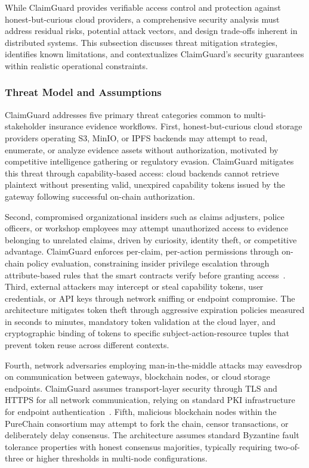 \documentclass[final,5p,times,twocolumn]{elsarticle}
\begin{document}
While ClaimGuard provides verifiable access control and protection against honest-but-curious cloud providers, a comprehensive security analysis must address residual risks, potential attack vectors, and design trade-offs inherent in distributed systems. This subsection discusses threat mitigation strategies, identifies known limitations, and contextualizes ClaimGuard's security guarantees within realistic operational constraints.

\subsubsection{Threat Model and Assumptions}

ClaimGuard addresses five primary threat categories common to multi-stakeholder insurance evidence workflows. First, honest-but-curious cloud storage providers operating S3, MinIO, or IPFS backends may attempt to read, enumerate, or analyze evidence assets without authorization, motivated by competitive intelligence gathering or regulatory evasion. ClaimGuard mitigates this threat through capability-based access: cloud backends cannot retrieve plaintext without presenting valid, unexpired capability tokens issued by the gateway following successful on-chain authorization.

Second, compromised organizational insiders such as claims adjusters, police officers, or workshop employees may attempt unauthorized access to evidence belonging to unrelated claims, driven by curiosity, identity theft, or competitive advantage. ClaimGuard enforces per-claim, per-action permissions through on-chain policy evaluation, constraining insider privilege escalation through attribute-based rules that the smart contracts verify before granting access~\cite{xiong2023bdim}. Third, external attackers may intercept or steal capability tokens, user credentials, or API keys through network sniffing or endpoint compromise. The architecture mitigates token theft through aggressive expiration policies measured in seconds to minutes, mandatory token validation at the cloud layer, and cryptographic binding of tokens to specific subject-action-resource tuples that prevent token reuse across different contexts.

Fourth, network adversaries employing man-in-the-middle attacks may eavesdrop on communication between gateways, blockchain nodes, or cloud storage endpoints. ClaimGuard assumes transport-layer security through TLS and HTTPS for all network communication, relying on standard PKI infrastructure for endpoint authentication~\cite{dorri2017coordination}. Fifth, malicious blockchain nodes within the PureChain consortium may attempt to fork the chain, censor transactions, or deliberately delay consensus. The architecture assumes standard Byzantine fault tolerance properties with honest consensus majorities, typically requiring two-of-three or higher thresholds in multi-node configurations.
\end{document}
